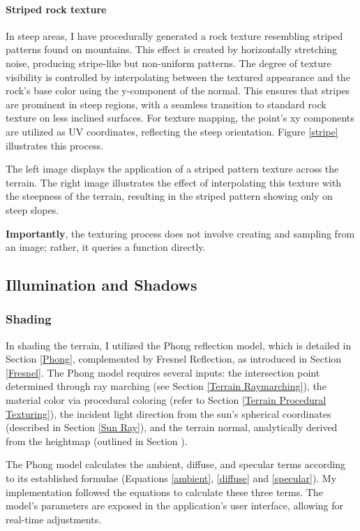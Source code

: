 \paragraph{Striped rock texture}
In steep areas, I have procedurally generated a rock texture resembling striped patterns found on mountains. This effect is created by horizontally stretching noise, producing stripe-like but non-uniform patterns. The degree of texture visibility is controlled by interpolating between the textured appearance and the rock's base color using the y-component of the normal. This ensures that stripes are prominent in steep regions, with a seamless transition to standard rock texture on less inclined surfaces. For texture mapping, the point's xy components are utilized as UV coordinates, reflecting the steep orientation. Figure \ref{stripe} illustrates this process.

{The left image displays the application of a striped pattern texture across the terrain. The right image illustrates the effect of interpolating this texture with the steepness of the terrain, resulting in the striped pattern showing only on steep slopes.}

\textbf{Importantly}, the texturing process does not involve creating and sampling from an image; rather, it queries a function directly.


\subsection{Illumination and Shadows}

\subsubsection{Shading}
\label{Terrain Shading}

In shading the terrain, I utilized the Phong reflection model, which is detailed in Section \ref{Phong}, complemented by Fresnel Reflection, as introduced in Section \ref{Fresnel}. The Phong model requires several inputs: the intersection point determined through ray marching (see Section \ref{Terrain Raymarching}), the material color via procedural coloring (refer to Section \ref{Terrain Procedural Texturing}), the incident light direction from the sun's spherical coordinates (described in Section \ref{Sun Ray}), and the terrain normal, analytically derived from the heightmap (outlined in Section ).

The Phong model calculates the ambient, diffuse, and specular terms according to its established formulae (Equations \ref{ambient}, \ref{diffuse} and \ref{specular}). My implementation followed the equations to calculate these three terms. The model's parameters are exposed in the application's user interface, allowing for real-time adjustments.

